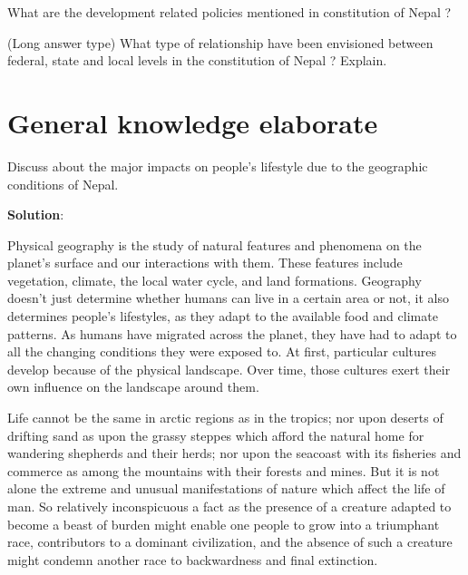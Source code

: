 \documentclass[
  openany]{book}
\newcommand{\question}{\item}
\newenvironment{solution}{ {\bfseries Solution}:}{}
\begin{document}
\begin{questions}

\question What are the development related policies mentioned in constitution of Nepal ?

\question (Long answer type) What type of relationship have been envisioned between federal, state and local levels in the constitution of Nepal ? Explain.

\end{questions}

\hypertarget{general-knowledge-elaborate}{%
\chapter{General knowledge elaborate}\label{general-knowledge-elaborate}}

\begin{questions}

\question Discuss about the major impacts on people's lifestyle due to the geographic conditions of Nepal.

\begin{solution}

Physical geography is the study of natural features and phenomena on the planet's surface and our interactions with them. These features include vegetation, climate, the local water cycle, and land formations. Geography doesn't just determine whether humans can live in a certain area or not, it also determines people's lifestyles, as they adapt to the available food and climate patterns. As humans have migrated across the planet, they have had to adapt to all the changing conditions they were exposed to. At first, particular cultures develop because of the physical landscape. Over time, those cultures exert their own influence on the landscape around them.

Life cannot be the same in arctic regions as in the tropics; nor upon deserts of drifting sand as upon the grassy steppes which afford the natural home for wandering shepherds and their herds; nor upon the seacoast with its fisheries and commerce as among the mountains with their forests and mines. But it is not alone the extreme and unusual manifestations of nature which affect the life of man. So relatively inconspicuous a fact as the presence of a creature adapted to become a beast of burden might enable one people to grow into a triumphant race, contributors to a dominant civilization, and the absence of such a creature might condemn another race to backwardness and final extinction.


\end{solution}
\end{questions}
\end{document}
